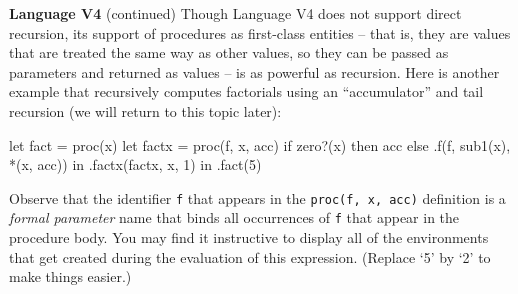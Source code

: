\begin{minipage}[t]{\sw}
\slidenumber
\LARGE
{\bf Language V4} (continued)\exx
Though Language V4 does not support direct recursion,
its support of procedures as first-class entities --
that is, they are values that are treated
the same way as other values,
so they can be passed as parameters and returned as values --
is as powerful as recursion.
Here is another example that recursively computes factorials
using an ``accumulator'' and tail recursion
(we will return to this topic later):
\Large
\begin{qv}
let
  fact = proc(x)
    let
      factx = proc(f, x, acc)
        if zero?(x)
        then acc
        else .f(f, sub1(x), *(x, acc))
    in
      .factx(factx, x, 1)
  in
    .fact(5)
\end{qv}
\LARGE
Observe that the identifier \verb'f' that appears
in the \verb'proc(f, x, acc)' definition
is a {\em formal parameter} name
that binds all occurrences of \verb'f'
that appear in the procedure body.
You may find it instructive to display all of the environments
that get created during the evaluation of this expression.
(Replace `5' by `2' to make things easier.)
\end{minipage}
\clearpage
